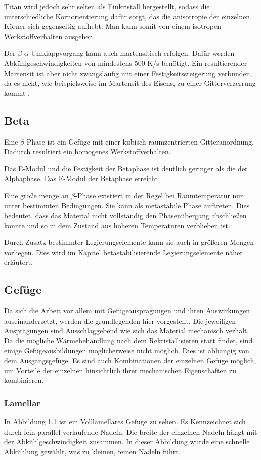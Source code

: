 \documentclass[a4paper, 11pt]{tubsreprt}
\begin{document}
Titan wird jedoch sehr selten als Einkristall hergestellt, sodass die unterschiedliche Kornorientierung dafür sorgt, das die anisotropie der einzelnen Körner sich gegenseitig aufhebt. Man kann somit von einem isotropen Werkstoffverhalten ausgehen.

Der $\beta$-$\alpha$ Umklappvorgang kann auch martensitisch erfolgen. Dafür werden Abkühlgeschwindigkeiten von mindestens 500 K/s benötigt. Ein resultierender Martensit ist aber nicht zwangsläufig mit einer Festigkeitssteigerung verbunden, da es nicht, wie beispielsweise im Martensit des Eisens, zu einer Gitterverzerrung kommt \citep[vgl. ]{Siemers2017}.
\subsection{Beta}
Eine $\beta$-Phase ist ein Gefüge mit einer kubisch raumzentrierten Gitteranordnung. Dadurch resultiert ein homogenes Werkstoffverhalten.

Das E-Modul und die Festigkeit der Betaphase ist deutlich geringer als die der Alphaphase. Das E-Modul der Betaphase erreicht

Eine große menge an $\beta$-Phase existiert in der Regel bei Raumtemperatur nur unter bestimmten Bedingungen. Sie kann als metastabile Phase auftreten. Dies bedeutet, dass das Material nicht vollständig den Phasenübergang abschließen konnte und so in dem Zustand aus höheren Temperaturen verblieben ist. 

Durch Zusatz bestimmter Legierungselemente kann sie auch in größeren Mengen vorliegen. Dies wird im Kapitel betastabilisierende Legierungselemente näher erläutert.
\subsection{Gefüge}
Da sich die Arbeit vor allem mit Gefügeausprägungen und ihren Auswirkungen auseinandersetzt, werden die grundlegenden hier vorgestellt. Die jeweiligen Ausprägungen sind Ausschlaggebend wie sich das Material mechanisch verhält. Da die mögliche Wärmebehandlung nach dem Rekristallisieren statt findet, sind einige Gefügeausbildungen möglicherweise nicht möglich. Dies ist abhängig von dem Ausgangsgefüge.
Es sind auch Kombinationen der einzelnen Gefüge möglich, um Vorteile der einzelnen hinsichtlich ihrer mechanischen Eigenschaften zu kombinieren.
\subsubsection{Lamellar}
In Abbildung 1.1 ist ein Volllamellares Gefüge zu sehen. Es Kennzeichnet sich durch fein parallel verlaufende Nadeln. Die breite der einzelnen Nadeln hängt mit der Abkühlgeschwindigkeit zusammen. In dieser Abbildung wurde eine schnelle Abkühlung gewählt, was zu kleinen, feinen Nadeln führt. 
\end{document}
